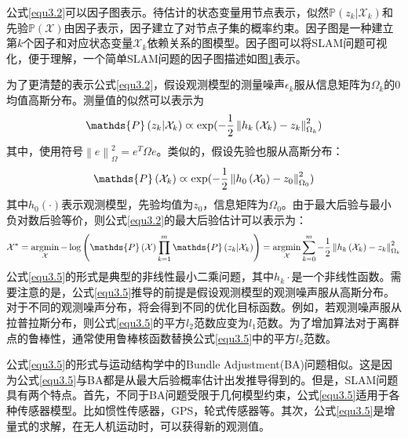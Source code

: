 公式\eqref{equ3.2}可以因子图表示。待估计的状态变量用节点表示，似然$\mathds{P}\left(z_k \vert \mathcal{X}_k  \right)$和先验$\mathds{P}\left(\mathcal{X} \right)$由因子表示，因子建立了对节点子集的概率约束。因子图是一种建立第$k$个因子和对应状态变量$\mathcal{X}_k$依赖关系的图模型。因子图可以将SLAM问题可视化，便于理解，一个简单SLAM问题的因子图描述如图\ref{fig3.3}表示。
\begin{figure}
\label{fig3.3}

\end{figure}



为了更清楚的表示公式\eqref{equ3.2}，假设观测模型的测量噪声$\epsilon_k$服从信息矩阵为$\Omega_k$的0均值高斯分布。测量值的似然可以表示为
\begin{equation}
\label{equ3.3}
\mathds{P}\left(z_k \vert \mathcal{X}_k  \right) \varpropto \exp ( -{1 \over 2} \left\| h_k\left( \mathcal{X}_k \right) - z_k \right\|_{\Omega_k}^2 )
\end{equation}
其中，使用符号$\left\| e \right\|_{\Omega}^2 = e^T \Omega e$。类似的，假设先验也服从高斯分布：
\begin{equation}
\label{equ3.4}
\mathds{P}\left( \mathcal{X}_k  \right) \varpropto \exp ( -{1 \over 2} \left\| h_0\left( \mathcal{X}_0 \right) - z_0 \right\|_{\Omega_0}^2 )
\end{equation}
其中$h_0(\cdot)$表示观测模型，先验均值为$z_0$，信息矩阵为$\Omega_0$。由于最大后验与最小负对数后验等价，则公式\eqref{equ3.2}的最大后验估计可以表示为：
\begin{equation}
\label{equ3.5}
\mathcal{X}^* 
=
\argmin \limits_{\mathcal{X}} - \log \left( \mathds{P}\left(\mathcal{X}\right) \prod \limits_{k=1}^{m} \mathds{P}\left(z_k \vert \mathcal{X}_k  \right) \right)
=
\argmin \limits_{\mathcal{X}} \sum \limits_{k=0}^{m} -{1 \over 2} \left\| h_k\left( \mathcal{X}_k \right) - z_k \right\|_{\Omega_k}^2
\end{equation}
公式\eqref{equ3.5}的形式是典型的非线性最小二乘问题，其中$h_k{\cdot}$是一个非线性函数。需要注意的是，公式\eqref{equ3.5}推导的前提是假设观测模型的观测噪声服从高斯分布。对于不同的观测噪声分布，将会得到不同的优化目标函数。例如，若观测噪声服从拉普拉斯分布，则公式\eqref{equ3.5}的平方$l_2$范数应变为$l_1$范数。为了增加算法对于离群点的鲁棒性，通常使用鲁棒核函数替换公式\eqref{equ3.5}中的平方$l_2$范数。

公式\eqref{equ3.5}的形式与运动结构学中的Bundle Adjustment(BA)问题相似。这是因为公式\eqref{equ3.5}与BA都是从最大后验概率估计出发推导得到的。但是，SLAM问题具有两个特点。首先，不同于BA问题受限于几何模型约束，公式\eqref{equ3.5}适用于各种传感器模型。比如惯性传感器，GPS，轮式传感器等。其次，公式\eqref{equ3.5}是增量式的求解，在无人机运动时，可以获得新的观测值。


